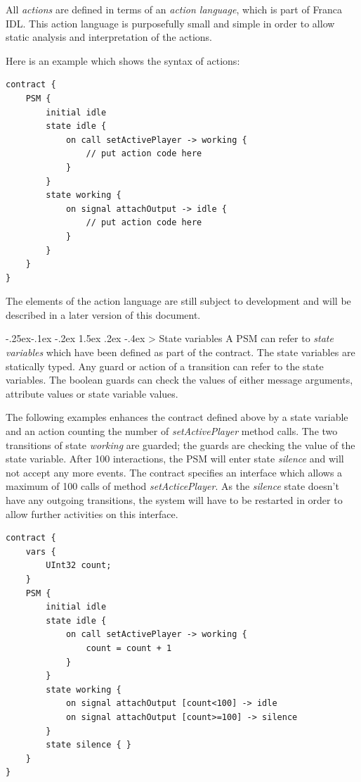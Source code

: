 \documentclass[a4paper,10pt]{scrreprt}
\makeatletter
\renewcommand\subsection{\medskip\@startsection{subsection}{2}{\z@}%
  {-.25ex\@plus -.1ex \@minus -.2ex}%
  {1.5ex \@plus .2ex \@minus -.4ex}%
  {\ifnum \scr@compatibility>\@nameuse{scr@v@2.96}\relax
    \setlength{\parfillskip}{\z@ plus 1fil}\fi
    \raggedsection\normalfont\sectfont\nobreak\size@subsection
  }%
}
\makeatother
\begin{document}
All \textit{actions} are defined in terms of an \textit{action language}, which is
part of Franca IDL. This action language is purposefully small and simple
in order to allow static analysis and interpretation of the actions.

Here is an example which shows the syntax of actions:

\begin{lstlisting}[language=Franca]
contract {
	PSM {
		initial idle
		state idle {
			on call setActivePlayer -> working {
				// put action code here
			}	
		}
		state working {
			on signal attachOutput -> idle {
				// put action code here
			}
		}
	}
}
\end{lstlisting}

The elements of the action language are still subject to development
and will be described in a later version of this document.   

\subsection{State variables}
\label{FIDL_Contracts_StateVars}
A PSM can refer to \textit{state variables} which have been defined as part
of the contract. The state variables are statically typed.
Any guard or action of a transition can refer to the state variables.
The boolean guards can check the values of either message arguments,
attribute values or state variable values.

The following examples enhances the contract defined above by a state variable
and an action counting the number of \textit{setActivePlayer} method calls.
The two transitions of state \textit{working} are guarded; the guards are checking
the value of the state variable. After 100 interactions, the PSM will
enter state \textit{silence} and will not accept any more events.
The contract specifies an interface which allows a maximum of 100 calls of 
method \textit{setActicePlayer}. As the \textit{silence} state doesn't have any outgoing 
transitions, the system will have to be restarted in order to allow further
activities on this interface.

\begin{lstlisting}[language=Franca]
contract {
	vars {
		UInt32 count;
	}
	PSM {
		initial idle
		state idle {
			on call setActivePlayer -> working {
				count = count + 1
			}	
		}
		state working {
			on signal attachOutput [count<100] -> idle
			on signal attachOutput [count>=100] -> silence
		}
		state silence { }
	}
}
\end{lstlisting}
\end{document}
